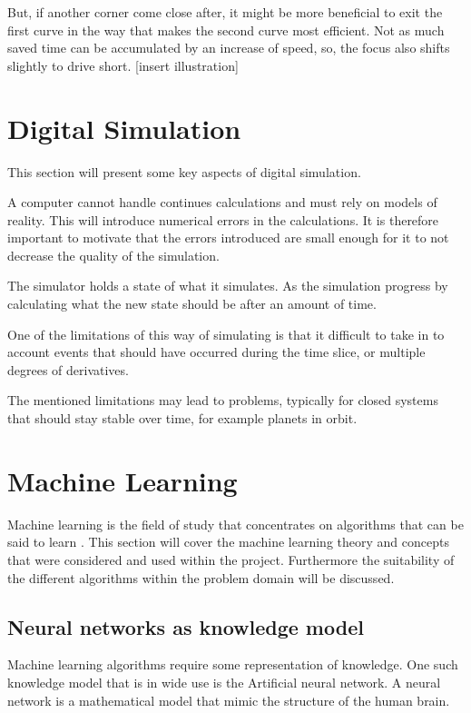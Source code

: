 But, if another corner come close after, it might be more beneficial to exit the first curve in the way that makes the second curve most efficient. Not as much saved time can be accumulated by an increase of speed, so, the focus also shifts slightly to drive short. [insert illustration]

\section{Digital Simulation}

This section will present some key aspects of digital simulation. 

A computer cannot handle continues calculations and must rely on models of reality. This will introduce numerical errors in the calculations. It is therefore important to motivate that the errors introduced are small enough for it to not decrease the quality of the simulation.

The simulator holds a state of what it simulates. As the simulation progress by calculating what the new state should be after an amount of time. 

One of the limitations of this way of simulating is that it difficult to take in to account events that should have occurred during the time slice, or multiple degrees of derivatives. 

The mentioned limitations may lead to problems, typically for closed systems that should stay stable over time, for example planets in orbit. 

\section{Machine Learning}
Machine learning is the field of study that concentrates on algorithms that can be said to learn \cite{glossary}. This section will cover the machine learning theory and concepts that were considered and used within the project. Furthermore the suitability of the different algorithms within the problem domain will be discussed.  

\subsection{Neural networks as knowledge model}
Machine learning algorithms require some representation of knowledge. One such knowledge model that is in wide use is the Artificial neural network. A neural network is a mathematical model that mimic the structure of the human brain. 

